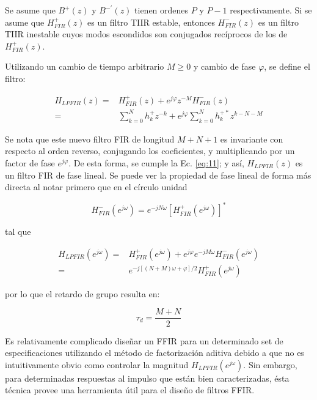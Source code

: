     Se asume que $B^{+}(z)$ y $B^{-\prime}(z)$ tienen ordenes $P$ y $P-1$ respectivamente. Si se asume que $H_{FIR}^{ +}(z)$ es un filtro TIIR estable, entonces $H_{FIR}^{-}(z)$ es un filtro TIIR inestable cuyos modos escondidos son conjugados recíprocos de los de $H_{FIR}^{ +}(z)$.

    Utilizando un cambio de tiempo arbitrario $M \geq 0$ y cambio de fase $\varphi$, se define el filtro:

    \begin{align}
      H_{LPFIR}(z) =& H_{FIR}^{ + } (z) + e^{j\varphi} z^{-M} H_{FIR}^{-}(z) \\
      =& \sum_{k=0}^{N}{h_k^{ + } z^{-k}} + e^{j \varphi} \sum_{k=0}^{N}{h_k^{+*} z^{k-N-M}}
    \end{align}

    Se nota que este nuevo filtro FIR de longitud $M+N+1$ es invariante con respecto al orden reverso, conjugando los coeficientes, y multiplicando por un factor de fase $e^{j\varphi}$. De esta forma, se cumple la Ec. \ref{eq:11}; y así, $H_{LPFIR}(z)$ es un filtro FIR de fase lineal. Se puede ver la propiedad de fase lineal de forma más directa al notar primero que en el círculo unidad

    \begin{equation}
      H_{FIR}^{-}(e^{j\omega}) = e^{-jN\omega} \left[ H_{FIR}^{ + } \left( e^{j\omega} \right ) \right]^{*}
      \label{eq:53}
    \end{equation}

    tal que

    \begin{align}
      H_{LPFIR}(e^{j\omega}) =& H_{FIR}^{+}\left( e^{j\omega} \right) + e^{j\varphi} e^{-jM\omega} H_{FIR}^{-} \left( e^{j\omega} \right) \\
      =& e^{-j[(N + M)\omega + \varphi]/2} H_{FIR}^{ + } \left( e^{j\omega} \right)
    \end{align}

    por lo que el retardo de grupo resulta en:

    \begin{equation}
      \tau_d = \frac{M+N}{2}
    \end{equation}

    Es relativamente complicado diseñar un FFIR para un determinado set de especificaciones utilizando el método de factorización aditiva debido a que no es intuitivamente obvio como controlar la magnitud $H_{LPFIR}\left( e^{j\omega} \right)$. Sin embargo, para determinadas respuestas al impulso que están bien caracterizadas, ésta técnica provee una herramienta útil para el diseño de filtros FFIR.

